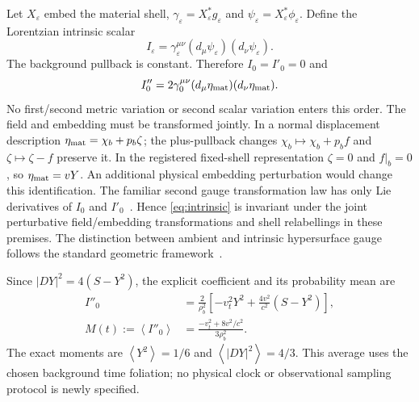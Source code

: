 \documentclass[11pt]{article}
\newcommand{\eps}{\varepsilon}
\newcommand{\avg}[1]{\left\langle #1\right\rangle}
\begin{document}
Let $X_\eps$ embed the material shell, $\gamma_\eps=X_\eps^*g_\eps$ and
$\psi_\eps=X_\eps^*\phi_\eps$. Define the Lorentzian intrinsic scalar
\begin{equation}
 I_\eps=\gamma_\eps^{\mu\nu}
             (d_\mu\psi_\eps)(d_\nu\psi_\eps).
\end{equation}
The background pullback is constant. Therefore $I_0=I'_0=0$ and
\begin{equation}
 I''_0=2\gamma_0^{\mu\nu}
             (d_\mu\eta_{\rm mat})(d_\nu\eta_{\rm mat}).
 \label{eq:intrinsic}
\end{equation}
No first/second metric variation or second scalar variation enters this order.
The field and embedding must be transformed jointly. In a normal displacement
description $\eta_{\rm mat}=\chi_b+p_b\zeta$; the plus-pullback changes
$\chi_b\mapsto\chi_b+p_b f$ and $\zeta\mapsto\zeta-f$ preserve it.
In the registered fixed-shell representation $\zeta=0$ and $f|_b=0$, so
$\eta_{\rm mat}=vY$. An additional physical embedding perturbation would
change this identification. The familiar second gauge transformation law
has only Lie derivatives of $I_0$ and $I'_0$~\cite{bmm2006,bmm2007}.
Hence \eqref{eq:intrinsic} is invariant under the joint perturbative
field/embedding transformations and shell relabellings in these premises.
The distinction between ambient and intrinsic hypersurface gauge follows
the standard geometric framework~\cite{mars}.

Since $|DY|^2=4(S-Y^2)$, the explicit coefficient and its probability mean are
\begin{align}
 I''_0&=\frac2{\rho_b^2}
       \left[-v_t^2Y^2+\frac{4v^2}{c^2}(S-Y^2)\right],\\
 M(t):=\avg{I''_0}&=\frac{-v_t^2+8v^2/c^2}{3\rho_b^2}.
 \label{eq:mean}
\end{align}
The exact moments are $\avg{Y^2}=1/6$ and $\avg{|DY|^2}=4/3$.
This average uses the chosen background time foliation; no physical clock
or observational sampling protocol is newly specified.
\end{document}
